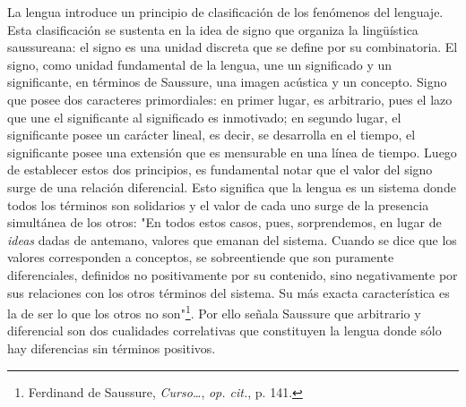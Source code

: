 \documentclass{book}
\begin{document}
La lengua introduce un principio de clasificación de los fenómenos del
lenguaje. Esta clasificación se sustenta en la idea de signo que
organiza la lingüística saussureana: el signo es una unidad discreta que
se define por su combinatoria. El signo, como unidad fundamental de la
lengua, une un significado y un significante, en términos de Saussure,
una imagen acústica y un concepto. Signo que posee dos caracteres
primordiales: en primer lugar, es arbitrario, pues el lazo que une el
significante al significado es inmotivado; en segundo lugar, el
significante posee un carácter lineal, es decir, se desarrolla en el
tiempo, el significante posee una extensión que es mensurable en una
línea de tiempo. Luego de establecer estos dos principios, es
fundamental notar que el valor del signo surge de una relación
diferencial. Esto significa que la lengua es un sistema donde todos los
términos son solidarios y el valor de cada uno surge de la presencia
simultánea de los otros: "En todos estos casos, pues, sorprendemos, en
lugar de \emph{ideas} dadas de antemano, valores que emanan del sistema.
Cuando se dice que los valores corresponden a conceptos, se
sobreentiende que son puramente diferenciales, definidos no
positivamente por su contenido, sino negativamente por sus relaciones
con los otros términos del sistema. Su más exacta característica es la
de ser lo que los otros no son"\footnote{Ferdinand de Saussure,
  \emph{Curso\ldots{}}, \emph{op. cit.}, p. 141.}. Por ello señala
Saussure que arbitrario y diferencial son dos cualidades correlativas
que constituyen la lengua donde sólo hay diferencias sin términos
positivos.
\end{document}
